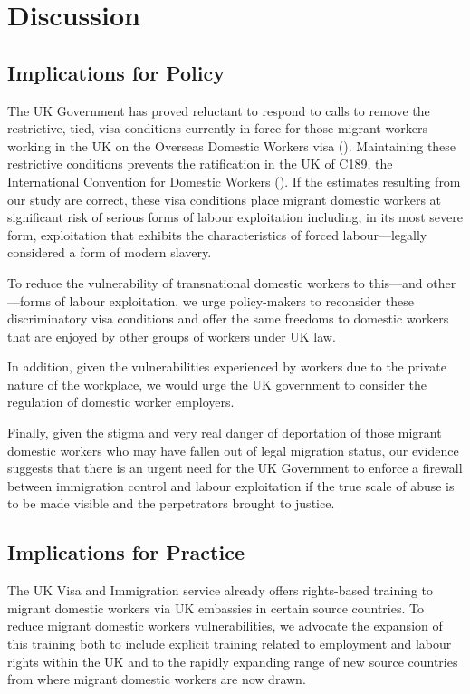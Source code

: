 \documentclass[
  12pt,
  letterpaper,
  DIV=11,
  numbers=noendperiod]{scrartcl}
\theoremstyle{plain}
\theoremstyle{definition}
\begin{document}
\section{Discussion}\label{discussion}

\subsection{Implications for Policy}\label{implications-for-policy}

The UK Government has proved reluctant to respond to calls to remove the
restrictive, tied, visa conditions currently in force for those migrant
workers working in the UK on the Overseas Domestic Workers visa
(\textcite{gower_calls_2016}). Maintaining these restrictive conditions
prevents the ratification in the UK of C189, the International
Convention for Domestic Workers (\textcite{ILO11-indicators}). If the
estimates resulting from our study are correct, these visa conditions
place migrant domestic workers at significant risk of serious forms of
labour exploitation including, in its most severe form, exploitation
that exhibits the characteristics of forced labour---legally considered
a form of modern slavery.

To reduce the vulnerability of transnational domestic workers to
this---and other---forms of labour exploitation, we urge policy-makers
to reconsider these discriminatory visa conditions and offer the same
freedoms to domestic workers that are enjoyed by other groups of workers
under UK law.

In addition, given the vulnerabilities experienced by workers due to the
private nature of the workplace, we would urge the UK government to
consider the regulation of domestic worker employers.

Finally, given the stigma and very real danger of deportation of those
migrant domestic workers who may have fallen out of legal migration
status, our evidence suggests that there is an urgent need for the UK
Government to enforce a firewall between immigration control and labour
exploitation if the true scale of abuse is to be made visible and the
perpetrators brought to justice.

\subsection{Implications for Practice}\label{implications-for-practice}

The UK Visa and Immigration service already offers rights-based training
to migrant domestic workers via UK embassies in certain source
countries. To reduce migrant domestic workers vulnerabilities, we
advocate the expansion of this training both to include explicit
training related to employment and labour rights within the UK and to
the rapidly expanding range of new source countries from where migrant
domestic workers are now drawn.
\end{document}
